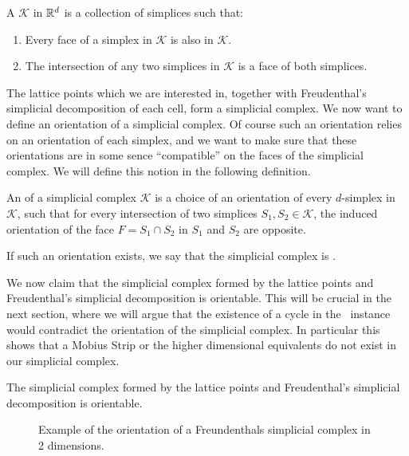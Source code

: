 \begin{definition}
    A  $\mathcal{K}$ in $\mathbb{R}^d$ is a collection of simplices such that:
    \begin{enumerate}
        \item Every face of a simplex in $\mathcal{K}$ is also in $\mathcal{K}$.
        \item The intersection of any two simplices in $\mathcal{K}$ is a face of both simplices.
    \end{enumerate}
\end{definition}

The lattice points which we are interested in, together with Freudenthal's simplicial decomposition of each cell, form a simplicial complex. We now want to define an orientation of a simplicial complex. Of course such an orientation relies on an orientation of each simplex, and we want to make sure that these orientations are in some sence ``compatible'' on the faces of the simplicial complex. We will define this notion in the following definition.

\begin{definition}
    An  of a simplicial complex $\mathcal{K}$ is a choice of an orientation of every $d$-simplex in $\mathcal{K}$, such that for every intersection of two simplices $S_1, S_2 \in \mathcal{K}$, the induced orientation of the face $F = S_1 \cap S_2$ in $S_1$ and $S_2$ are opposite. \par
    If such an orientation exists, we say that the simplicial complex is .
\end{definition}

We now claim that the simplicial complex formed by the lattice points and Freudenthal's simplicial decomposition is orientable. This will be crucial in the next section, where we will argue that the existence of a cycle in the \EndOfLine\ instance would contradict the orientation of the simplicial complex. In particular this shows that a Mobius Strip or the higher dimensional equivalents do not exist in our simplicial complex.

\begin{claim}
    The simplicial complex formed by the lattice points and Freudenthal's simplicial decomposition is orientable.
\end{claim}

\begin{figure}[h]
    \centering
    \caption[Orientation of a simplicial complex]{Example of the orientation of a Freundenthals simplicial complex in 2 dimensions.}
    \label{fig:orientation_of_simplicial_complex}
\end{figure}

